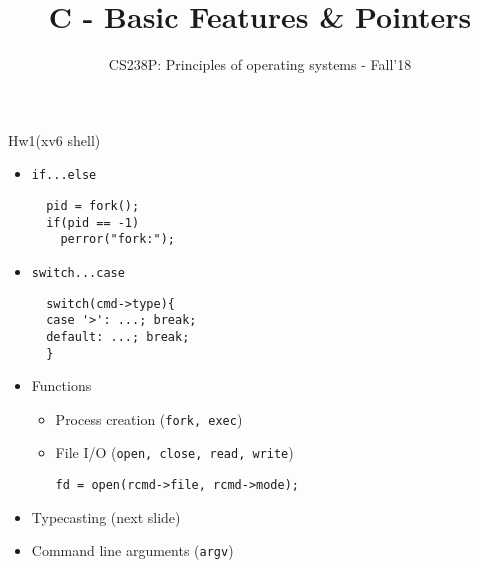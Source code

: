 \documentclass[10pt]{beamer}
\title{C - Basic Features \& Pointers} %
\subtitle{CS238P: Principles of operating systems - Fall'18}
\date{}
\institute{University of California, Irvine}
\begin{document}
\maketitle


\iffalse
\begin{frame}{Data types}
\begin{itemize}
\item char (1 byte)
\item int, long (4/8 bytes)
\item float, double
\end{itemize}
\end{frame}

\begin{frame}{Loops}
\begin{itemize}
\item \texttt{for}
\item \texttt{do...while}
\item \texttt{while}
\end{itemize}
\end{frame}
\fi

\begin{frame}[fragile]{Hw1(xv6 shell)}
\begin{itemize}
\item<1-> \texttt{if...else}
\begin{verbatim}
  pid = fork();
  if(pid == -1)
    perror("fork:");
\end{verbatim}
\item<2-> \texttt{switch...case}
\begin{verbatim}
  switch(cmd->type){
  case '>': ...; break;
  default: ...; break;
  }
\end{verbatim}
\item<3-> Functions
\begin{itemize}
\item Process creation (\texttt{fork, exec})
\item File I/O (\texttt{open, close, read, write})
\begin{verbatim}
fd = open(rcmd->file, rcmd->mode);
\end{verbatim}
\end{itemize}
\item<4-> Typecasting (next slide)
\item<5-> Command line arguments (\texttt{argv})
\end{itemize}
\end{frame}
\end{document}

